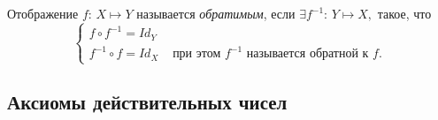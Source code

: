     \begin{definition}
        Отображение $f$: $X \mapsto Y$ называется \textit{обратимым}, если $\exists f^{-1}$: $Y \mapsto X,$ такое, что
        \begin{equation*}
            \begin{cases}
                f \circ f^{-1} = Id_{Y}\\
                f^{-1} \circ f = Id_{X} & \text{ при этом $f^{-1}$ называется обратной к $f$.}
            \end{cases}
        \end{equation*}
        
    \end{definition}

    \subsection{Аксиомы действительных чисел}

